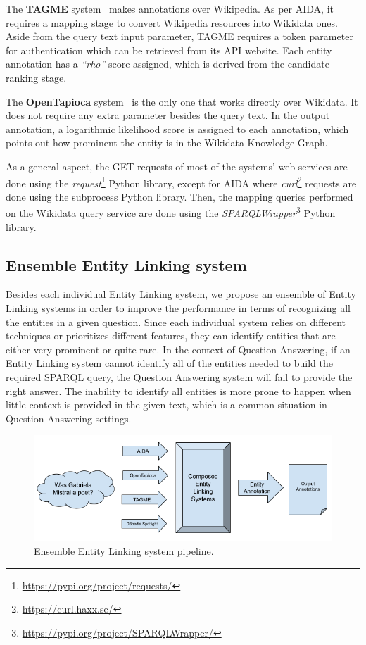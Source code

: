 The \textbf{TAGME} system~\cite{EL:tagme-FerraginaS10} makes annotations over Wikipedia. As 
per AIDA, it requires a mapping stage to convert Wikipedia resources into Wikidata ones. 
Aside from the query text input parameter, TAGME requires a token parameter for authentication 
which can be retrieved from its API website. Each entity annotation has a \textit{“rho”} score 
assigned, which is derived from the candidate ranking stage.

The \textbf{OpenTapioca} system~\cite{EL:opentapioca-Delpeuch19} is the only one that works 
directly over Wikidata. It does not require any extra parameter besides the query text. In 
the output annotation, a logarithmic likelihood score is assigned to each annotation, which 
points out how prominent the entity is in the Wikidata Knowledge Graph.

As a general aspect, the GET requests of most of the systems’ web services are done using the 
\textit{request}\footnote{\url{https://pypi.org/project/requests/}} Python library, except for AIDA 
where \textit{curl}\footnote{\url{https://curl.haxx.se/}} requests are done using the subprocess 
Python library. Then, the mapping queries performed on the Wikidata query service are done 
using the \textit{SPARQLWrapper}\footnote{\url{https://pypi.org/project/SPARQLWrapper/}} Python 
library.

\subsection{Ensemble Entity Linking system}
\label{cap3:system/entLinModule/ensembleSystems}
Besides each individual Entity Linking system, we propose an ensemble of Entity Linking systems 
in order to improve the performance in terms of recognizing all the entities in a given 
question. Since each individual system relies on different techniques or prioritizes different 
features, they can identify entities that are either very prominent or quite rare. In the 
context of Question Answering, if an Entity Linking system cannot identify all of the entities 
needed to build the required SPARQL query, the Question Answering system will fail to provide 
the right answer. The inability to identify all entities is more prone to happen when little 
context is provided in the given text, which is a common situation in Question Answering 
settings.

\begin{figure}[!h]
    \centering
    \includegraphics[scale=.45]{imagenes/3_system_overview/esembleEntityLinkingSystem.png}
    \caption{Ensemble Entity Linking system pipeline.}
    \label{fig:esembleEntityLinking}
\end{figure}

